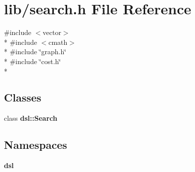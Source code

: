 \section{lib/search.h File Reference}
\label{search_8h}
{\ttfamily \#include $<$vector$>$}\\*
{\ttfamily \#include $<$cmath$>$}\\*
{\ttfamily \#include \char`\"{}graph.\-h\char`\"{}}\\*
{\ttfamily \#include \char`\"{}cost.\-h\char`\"{}}\\*
\subsection*{Classes}
\begin{DoxyCompactItemize}
\item 
class {\bf dsl\-::\-Search}
\end{DoxyCompactItemize}
\subsection*{Namespaces}
\begin{DoxyCompactItemize}
\item 
{\bf dsl}
\end{DoxyCompactItemize}
